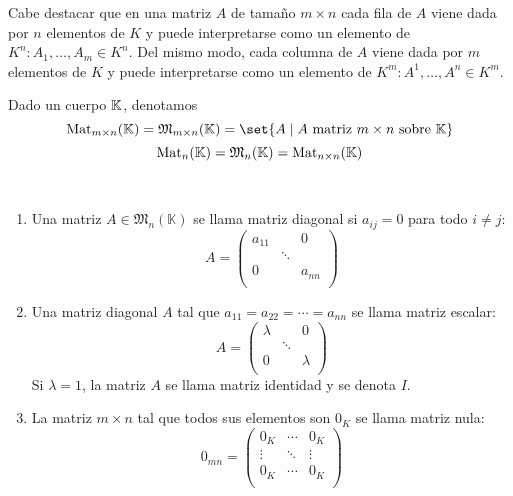Cabe destacar que en una matriz \(A \) de tamaño \(m \times n \) cada fila de \(A \) viene dada por \(n \) elementos de \(K \) y puede interpretarse como un elemento de \(K^{n }: A_1, \ldots, A_m \in K^{n } \). Del mismo modo, cada columna de \(A \) viene dada por \(m \) elementos de \(K\) y puede interpretarse como un elemento de \(K^{m }: A^{1}, \ldots, A^{n} \in K^{m}  \).
\begin{definition}
	Dado un cuerpo \(\mathbb{K} \), denotamos
	\[
		\mathrm{Mat}_{m\times n}(\K) = \mathfrak{M}_{m \times n}(\mathbb{K}) = \set{A \mid A \text{ matriz } m \times n \text{ sobre } \K  }
	\]
	\[
		\mathrm{Mat}_n(\mathbb{K} ) = \mathfrak{M}_{n}(\mathbb{K}) = \mathrm{Mat}_{n \times n }(\mathbb{K})
	\]
\end{definition}
\begin{definition}
	~
	\begin{enumerate}
		\item Una matriz \(A \in \mathfrak{M}_{n}(\mathbb{K}) \) se llama matriz diagonal si \(a_{ij} = 0 \) para todo \(i \neq j \):
		      \[
			      A = \begin{pmatrix}
				      a_{11 } &        & 0      \\
				              & \ddots &        \\
				      0       &        & a_{nn} \\
			      \end{pmatrix}
		      \]
		\item Una matriz diagonal \(A \) tal que \(a_{11} = a_{22} = \cdots = a_{nn} \) se llama matriz escalar:
		      \[
			      A = \begin{pmatrix}
				      \lambda &        & 0       \\
				              & \ddots &         \\
				      0       &        & \lambda \\
			      \end{pmatrix}
		      \]
		      Si \(\lambda = 1\), la matriz \(A \) se llama matriz identidad y se denota \(I \).
		\item La matriz \(m \times n \) tal que todos sus elementos son \(0_K\) se llama matriz nula:
		      \[
			      0_{mn} = \begin{pmatrix}
				      0_K    & \cdots & 0_K    \\
				      \vdots & \ddots & \vdots \\
				      0_K    & \cdots & 0_K    \\
			      \end{pmatrix}
\]
\end{enumerate}
\end{definition}
